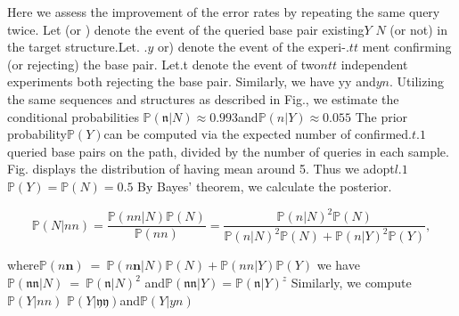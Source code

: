 \documentclass{article}
\begin{document}
Here we assess the improvement of the error rates by repeating the same
query twice. Let  (or ) denote the event of the queried base pair existing$Y$ $N$
(or not) in the target structure.Let. $. { y }$ or) denote the event of the experi-$. { t t }$
ment confirming (or rejecting) the base pair. Let.t denote the event of two$n t t$
independent experiments both rejecting the base pair. Similarly, we have yy
and$y n$. Utilizing the same sequences and structures as described in Fig., we
estimate the conditional probabilities $\mathbb { P } ( \mathfrak { n } | N ) \approx 0. 9 9 3$and$\mathbb { P } ( n | Y ) \approx 0. 0 5 5$ The
prior probability$\mathbb { P } ( Y )$can be computed via the expected number  of confirmed.$t . { 1 }$
queried base pairs on the path, divided by the number of queries in each sample. Fig. displays the distribution of  having mean around 5. Thus we adopt$l . { 1 }$
$\mathbb { P } ( Y ) = \mathbb { P } ( N ) = 0. 5$ By Bayes' theorem, we calculate the posterior.


\begin{equation}
\mathbb { P } ( N | n n ) = \frac { \mathbb { P } ( n n | N ) \mathbb { P } ( N ) } { \mathbb { P } ( n n ) } = \frac { \mathbb { P } ( n | N ) ^ { 2 } \mathbb { P } ( N ) } { \mathbb { P } ( n | N ) ^ { 2 } \mathbb { P } ( N ) + \mathbb { P } ( n | Y ) ^ { 2 } \mathbb { P } ( Y ) },
\end{equation}


where$\mathbb { P } ( n { \pmb n } ) ~ = ~ \mathbb { P } ( n { \pmb n } | N ) \mathbb { P } ( N ) + \mathbb { P } ( n n | Y ) \mathbb { P } ( Y )$ we have$\mathbb { P } ( \mathfrak { n n } | N ) ~ = ~ \mathbb { P } ( \mathfrak { n } | N ) ^ { 2 }$
and$\mathbb { P } ( { \mathfrak { n n } } | Y ) = \mathbb { P } ( { \mathfrak { n } } | Y ) ^ { z }$ Similarly, we compute$\mathbb { P } ( Y | n n )$ $\mathbb { P } ( Y | { \mathfrak { y y } } )$and$\mathbb { P } ( Y | y n )$
\end{document}
